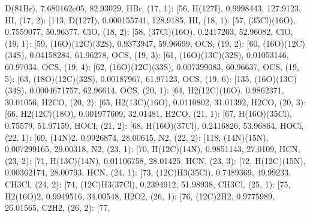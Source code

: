 \documentclass[letterpaper,10pt,english]{sphinxmanual}
\begin{document}
\begin{fulllineitems}
\textquotesingle{}D(81Br)\textquotesingle{}, 7.680162e\sphinxhyphen{}05, 82.93029, \textquotesingle{}HBr\textquotesingle{}{]}, (17, 1): {[}56, \textquotesingle{}H(127I)\textquotesingle{}, 0.9998443, 127.9123, \textquotesingle{}HI\textquotesingle{}{]}, (17, 2): {[}113, \textquotesingle{}D(127I)\textquotesingle{}, 0.000155741, 128.9185, \textquotesingle{}HI\textquotesingle{}{]}, (18, 1): {[}57, \textquotesingle{}(35Cl)(16O)\textquotesingle{}, 0.7559077, 50.96377, \textquotesingle{}ClO\textquotesingle{}{]}, (18, 2): {[}58, \textquotesingle{}(37Cl)(16O)\textquotesingle{}, 0.2417203, 52.96082, \textquotesingle{}ClO\textquotesingle{}{]}, (19, 1): {[}59, \textquotesingle{}(16O)(12C)(32S)\textquotesingle{}, 0.9373947, 59.96699, \textquotesingle{}OCS\textquotesingle{}{]}, (19, 2): {[}60, \textquotesingle{}(16O)(12C)(34S)\textquotesingle{}, 0.04158284, 61.96278, \textquotesingle{}OCS\textquotesingle{}{]}, (19, 3): {[}61, \textquotesingle{}(16O)(13C)(32S)\textquotesingle{}, 0.01053146, 60.97034, \textquotesingle{}OCS\textquotesingle{}{]}, (19, 4): {[}62, \textquotesingle{}(16O)(12C)(33S)\textquotesingle{}, 0.007399083, 60.96637, \textquotesingle{}OCS\textquotesingle{}{]}, (19, 5): {[}63, \textquotesingle{}(18O)(12C)(32S)\textquotesingle{}, 0.00187967, 61.97123, \textquotesingle{}OCS\textquotesingle{}{]}, (19, 6): {[}135, \textquotesingle{}(16O)(13C)(34S)\textquotesingle{}, 0.0004671757, 62.96614, \textquotesingle{}OCS\textquotesingle{}{]}, (20, 1): {[}64, \textquotesingle{}H2(12C)(16O)\textquotesingle{}, 0.9862371, 30.01056, \textquotesingle{}H2CO\textquotesingle{}{]}, (20, 2): {[}65, \textquotesingle{}H2(13C)(16O)\textquotesingle{}, 0.0110802, 31.01392, \textquotesingle{}H2CO\textquotesingle{}{]}, (20, 3): {[}66, \textquotesingle{}H2(12C)(18O)\textquotesingle{}, 0.001977609, 32.01481, \textquotesingle{}H2CO\textquotesingle{}{]}, (21, 1): {[}67, \textquotesingle{}H(16O)(35Cl)\textquotesingle{}, 0.75579, 51.97159, \textquotesingle{}HOCl\textquotesingle{}{]}, (21, 2): {[}68, \textquotesingle{}H(16O)(37Cl)\textquotesingle{}, 0.2416826, 53.96864, \textquotesingle{}HOCl\textquotesingle{}{]}, (22, 1): {[}69, \textquotesingle{}(14N)2\textquotesingle{}, 0.9926874, 28.00615, \textquotesingle{}N2\textquotesingle{}{]}, (22, 2): {[}118, \textquotesingle{}(14N)(15N)\textquotesingle{}, 0.007299165, 29.00318, \textquotesingle{}N2\textquotesingle{}{]}, (23, 1): {[}70, \textquotesingle{}H(12C)(14N)\textquotesingle{}, 0.9851143, 27.0109, \textquotesingle{}HCN\textquotesingle{}{]}, (23, 2): {[}71, \textquotesingle{}H(13C)(14N)\textquotesingle{}, 0.01106758, 28.01425, \textquotesingle{}HCN\textquotesingle{}{]}, (23, 3): {[}72, \textquotesingle{}H(12C)(15N)\textquotesingle{}, 0.00362174, 28.00793, \textquotesingle{}HCN\textquotesingle{}{]}, (24, 1): {[}73, \textquotesingle{}(12C)H3(35Cl)\textquotesingle{}, 0.7489369, 49.99233, \textquotesingle{}CH3Cl\textquotesingle{}{]}, (24, 2): {[}74, \textquotesingle{}(12C)H3(37Cl)\textquotesingle{}, 0.2394912, 51.98938, \textquotesingle{}CH3Cl\textquotesingle{}{]}, (25, 1): {[}75, \textquotesingle{}H2(16O)2\textquotesingle{}, 0.9949516, 34.00548, \textquotesingle{}H2O2\textquotesingle{}{]}, (26, 1): {[}76, \textquotesingle{}(12C)2H2\textquotesingle{}, 0.9775989, 26.01565, \textquotesingle{}C2H2\textquotesingle{}{]}, (26, 2): {[}77, 
\end{fulllineitems}
\end{document}
